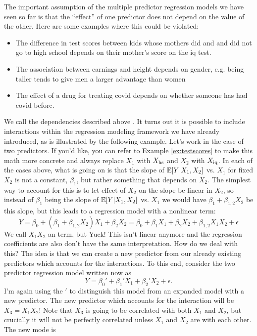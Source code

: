The important assumption of the multiple predictor regression models we have seen so far is that the ``effect'' of one predictor does not depend on the value of the other. Here are some examples where this could be violated:
\begin{itemize}
\item The difference in test scores between kids whose mothers did and and did not go to high school depends on their mother's score on the iq test.
\item  The association between earnings and height depends on gender, e.g. being taller tends to give men a larger advantage than women
\item The effect of a drug for treating covid depends on whether someone has had covid before. 
\end{itemize}
We call the dependencies described above . 
It turns out it is possible to include interactions within the regression modeling framework we have already introduced, as is illustrated by the following example. 
 Let's work in the case of two predictors. If you'd like, you can refer to Example \ref{ex:testscores} to make this math more concrete and always replace $X_1$ with $X_{\rm hs}$ and $X_2$ with $X_{\rm iq}$.   In each of the cases above, what is going on is that the slope of $\mathbb E[Y|X_1,X_2]$ vs. $X_1$ for fixed $X_2$ is not a constant, $\beta_1$, but rather something that depends on $X_2$. The simplest way to account for this is to let effect of $X_2$ on the slope be linear in $X_2$, so instead of $\beta_1$ being the slope of $\mathbb E[Y|X_1,X_2]$ vs. $X_1$ we would have $\beta_1 + \beta_{1,2}X_2$ be this slope, but this leads to a regression model with a nonlinear term: 
\begin{equation*}
Y = \beta_0 +(\beta_1 + \beta_{1,2}X_2) X_1  + \beta_2 X_2 = \beta_0 + \beta_1 X_1 + \beta_2 X_2 + \beta_{1,2}X_1 X_2 + \epsilon 
\end{equation*}
We call $X_1X_2$ an  term, but Yuck! This isn't linear anymore and the regression coefficients are also don't have the same interpretation. How do we deal with this? 
 The idea is that we can create a new predictor from our already existing predictors which accounts for the interactions. To this end, consider the two predictor regression model written now as 
\begin{equation*}
Y = \beta_0' + \beta_1' X_1 + \beta_2' X_2 + \epsilon.
\end{equation*} 
I'm again using the $'$ to distinguish this model from an expanded model with a new predictor. The new predictor which accounts for the interaction will be $X_3 = X_1X_2$! Note that $X_3$ is going to be correlated with both $X_1$ and $X_2$, but crucially it will not be perfectly correlated unless $X_1$ and $X_2$ are with each other. The new mode is 
